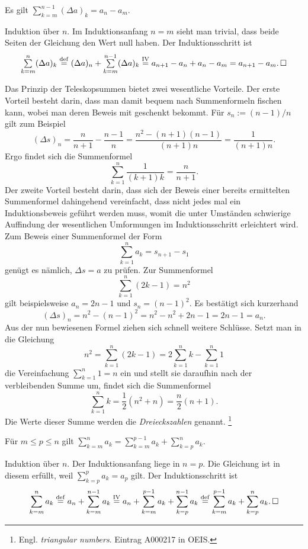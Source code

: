\begin{Satz}[Teleskopsumme]
Es gilt $\sum_{k=m}^{n-1} (\Delta a)_k = a_n - a_m$.
\end{Satz}
\begin{Beweis}
Induktion über $n$. Im Induktionsanfang $n=m$ sieht man trivial,
dass beide Seiten der Gleichung den Wert null haben. Der
Induktionsschritt ist%
\[\textstyle\sum\limits_{k=m}^n (\Delta a)_k \stackrel{\mathrm{def}}=
(\Delta a)_n + \sum\limits_{k=m}^{n-1} (\Delta a)_k
\stackrel{\mathrm{IV}}= a_{n+1} - a_n + a_n - a_m = a_{n+1} - a_m.\,\Box\]
\end{Beweis}

\noindent
Das Prinzip der Teleskopsummen bietet zwei wesentliche Vorteile. 
Der erste Vorteil besteht darin, dass man damit bequem nach
Summenformeln fischen kann, wobei man deren Beweis mit geschenkt
bekommt. Für $s_n := (n-1)/n$ gilt zum Beispiel%
\[(\Delta s)_n = \frac{n}{n+1} - \frac{n-1}{n}
= \frac{n^2 - (n+1)(n-1)}{(n+1)n} = \frac{1}{(n+1)n}.\]
Ergo findet sich die Summenformel
\[\sum_{k=1}^n \frac{1}{(k+1)k} = \frac{n}{n+1}.\]
Der zweite Vorteil besteht darin, dass sich der Beweis einer bereits
ermittelten Summenformel dahingehend vereinfacht, dass nicht jedes
mal ein Induktionsbeweis geführt werden muss, womit die unter Umständen
schwierige Auffindung der wesentlichen Umformungen im Induktionsschritt
erleichtert wird. Zum Beweis einer Summenformel der Form%
\[\textstyle\sum_{k=1}^n a_k = s_{n+1} - s_1\]
genügt es nämlich, $\Delta s = a$ zu prüfen. Zur Summenformel%
\[\textstyle\sum_{k=1}^n (2k-1) = n^2\]
gilt beispielsweise $a_n = 2n-1$ und $s_n = (n-1)^2$. Es bestätigt sich
kurzerhand%
\[(\Delta s)_n = n^2 - (n-1)^2 = n^2 - n^2 + 2n - 1  = 2n-1 = a_n.\]
Aus der nun bewiesenen Formel ziehen sich schnell weitere Schlüsse.
Setzt man in die Gleichung%
\[\textstyle n^2 = \sum_{k=1}^n (2k-1) = 2\sum_{k=1}^n k - \sum_{k=1}^n 1\]
die Vereinfachung $\sum_{k=1}^n 1 = n$ ein und stellt sie daraufhin nach
der verbleibenden Summe um, findet sich die Summenformel%
\[\sum_{k=1}^n k = \frac{1}{2}(n^2 + n) = \frac{n}{2}(n+1).\]
Die Werte dieser Summe werden die \emph{Dreieckszahlen} genannt.%
\footnote{Engl. \emph{triangular numbers}. Eintrag A000217 in OEIS.}

\begin{Satz}%
\label{Summe-Aufteilung}\newlinefirst
Für $m\le p\le n$ gilt
$\sum_{k=m}^n a_k = \sum_{k=m}^{p-1} a_k+\sum_{k=p}^n a_k$.
\end{Satz}
\begin{Beweis}
Induktion über $n$. Der Induktionsanfang liege in $n=p$. Die Gleichung
ist in diesem erfüllt, weil $\sum_{k=p}^p a_k=a_p$ gilt.
Der Induktionsschritt ist%
\[\sum\limits_{k=m}^n a_k \stackrel{\mathrm{def}}= a_n+\sum\limits_{k=m}^{n-1} a_k
\stackrel{\mathrm{IV}}= a_n + \sum\limits_{k=m}^{p-1} a_k + \sum\limits_{k=p}^{n-1} a_k
\stackrel{\mathrm{def}}= \sum\limits_{k=m}^{p-1} a_k + \sum\limits_{k=p}^n a_k.\,\Box\]
\end{Beweis}

